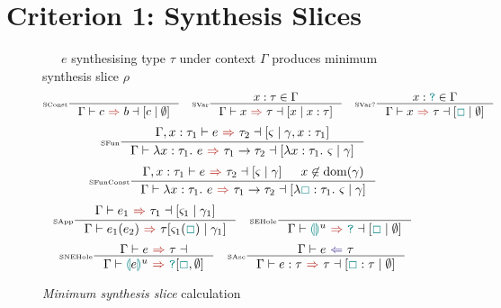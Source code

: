 \section{Criterion 1: Synthesis Slices}
\begin{figure}[H]
\small
{}\ \ \ $e$ synthesising type $\tau$ under context $\Gamma$ produces minimum synthesis slice $\rho$
\tiny
\[\inference[\tiny SConst]{}{\synthesisslice{c}{b}{[c\mid \emptyset]}} \quad
\inference[\tiny SVar]{x : \tau \in \Gamma}{\synthesisslice{x}{\tau}{[x\mid x:\tau]}} \quad
\inference[\tiny SVar?]{x : \dyn \in \Gamma}{\synthesisslice{x}{\tau}{[\gap\mid \emptyset]}}\]
\[\inference[\tiny SFun]{\synthesisslice[\Gamma,x:\tau_1]{e}{\tau_2}{[\varsigma \mid \gamma, x : \tau_1]} }{\synthesisslice{\lambda x:\tau_1.\ e}{\tau_1 \to \tau_2}{[\lambda x : \tau_1.\ \varsigma \mid \gamma]}}\]
\[\inference[\tiny SFunConst]{\synthesisslice[\Gamma,x:\tau_1]{e}{\tau_2}{[\varsigma \mid \gamma]} & x \not \in \mathrm{dom}(\gamma)}{\synthesisslice{\lambda x:\tau_1.\ e}{\tau_1 \to \tau_2}{[\lambda \gap : \tau_1.\ \varsigma \mid \gamma]}}\]
\[\inference[\tiny SApp]{\synthesisslice{e_1}{\tau_1}{[\varsigma_1 \mid \gamma_1]}}{\synthesis{e_1(e_2)}{\tau}{[\varsigma_1(\gap) \mid \gamma_1]}} \quad 
\inference[\tiny SEHole]{}{\synthesisslice{\hole^u}{\dyn}{[\gap \mid \emptyset]}}\]
\[\inference[\tiny SNEHole]{\synthesisslice{e}{\tau}}{\synthesis{\hole[e]^u}{\dyn}{[\gap, \emptyset]}}\quad 
\inference[\tiny SAsc]{\analysis{e}{\tau}}{\synthesisslice{e : \tau}{\tau}{[\gap : \tau \mid \emptyset]}}\]

\caption{\textit{Minimum synthesis slice} calculation}
\label{fig:SynthesisSlices}
\end{figure} 

